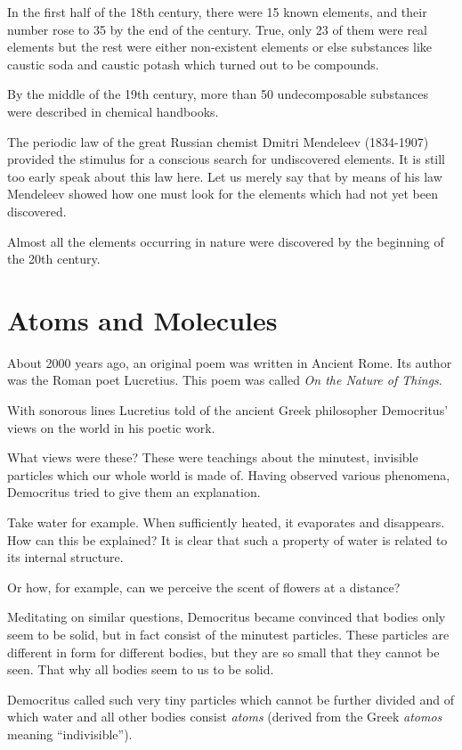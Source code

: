 In the first half of the 18th century, there were 15 known elements, and their number rose to 35 by the end of the century. True, only 23 of them were real elements but the rest were either non-existent elements or else substances like caustic soda and caustic potash which turned out to be compounds.

By the middle of the 19th century, more than 50 undecomposable substances were described in chemical handbooks.


The periodic law of the great Russian chemist Dmitri Mendeleev (1834-1907) provided the stimulus for a conscious search for undiscovered elements. It is still too early speak about this law here. Let us merely say that by means of his law Mendeleev showed how one must look for the elements which had not yet been dis­covered.

Almost all the elements occurring in nature were discovered by the beginning of the 20th century.


\section{Atoms and Molecules}

About 2000 years ago, an original poem was written in Ancient Rome. Its author was the Roman poet Lucre­tius. This poem was called \emph{On the Nature of Things}.

With sonorous lines Lucretius told of the ancient Greek philosopher Democritus’ views on the world in his poetic work.

What views were these? These were teachings about the minutest, invisible particles which our whole world is made of. Having observed various phenomena, De­mocritus tried to give them an explanation.

Take water for example. When sufficiently heated, it evaporates and disappears. How can this be explained? It is clear that such a property of water is related to its internal structure.

Or how, for example, can we perceive the scent of flowers at a distance? 

Meditating on similar questions, Democritus became convinced that bodies only seem to be solid, but in fact consist of the minutest particles.  These particles are different in form for different bodies, but they are
so small that they cannot be seen. That why all bodies seem to us to be solid.

Democritus called such very tiny particles which cannot be further divided and of which water and all other bodies consist \emph{atoms} (derived from the Greek \emph{atomos} meaning ``indivisible'').

